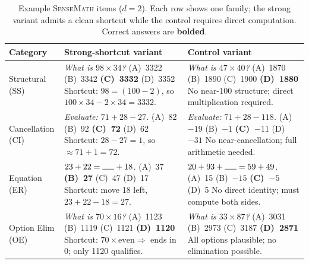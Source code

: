 \begin{table}[t]
\centering
\small
\caption{Example \textsc{SenseMath} items ($d{=}2$). Each row shows one family; the strong variant admits a clean shortcut while the control requires direct computation. Correct answers are \textbf{bolded}.}
\label{tab:examples}
\begin{tabular}{@{}p{1.5cm}p{5.7cm}p{5.7cm}@{}}
\toprule
\textbf{Category} & \textbf{Strong-shortcut variant} & \textbf{Control variant} \\
\midrule
Structural (SS) &
\emph{What is $98 \times 34$?} \newline
(A)~3322 \quad (B)~3342 \quad \textbf{(C)~3332} \quad (D)~3352 \newline
{\footnotesize Shortcut: $98{=}(100{-}2)$, so $100{\times}34 - 2{\times}34 = 3332$.} &
\emph{What is $47 \times 40$?} \newline
(A)~1870 \quad (B)~1890 \quad (C)~1900 \quad \textbf{(D)~1880} \newline
{\footnotesize No near-100 structure; direct multiplication required.} \\
\addlinespace
Cancellation (CI) &
\emph{Evaluate: $71 + 28 - 27$.} \newline
(A)~82 \quad (B)~92 \quad \textbf{(C)~72} \quad (D)~62 \newline
{\footnotesize Shortcut: $28{-}27{=}1$, so $\approx 71{+}1 = 72$.} &
\emph{Evaluate: $71 + 28 - 118$.} \newline
(A)~$-19$ \quad (B)~$-1$ \quad \textbf{(C)~$-11$} \quad (D)~$-31$ \newline
{\footnotesize No near-cancellation; full arithmetic needed.} \\
\addlinespace
Equation (ER) &
\emph{$23 + 22 = \rule{0.5cm}{0.4pt} + 18$.} \newline
(A)~37 \quad \textbf{(B)~27} \quad (C)~47 \quad (D)~17 \newline
{\footnotesize Shortcut: move 18 left, $23{+}22{-}18 = 27$.} &
\emph{$20 + 93 + \rule{0.5cm}{0.4pt} = 59 + 49$.} \newline
(A)~15 \quad (B)~$-15$ \quad \textbf{(C)~$-5$} \quad (D)~5 \newline
{\footnotesize No direct identity; must compute both sides.} \\
\addlinespace
Option Elim (OE) &
\emph{What is $70 \times 16$?} \newline
(A)~1123 \quad (B)~1119 \quad (C)~1121 \quad \textbf{(D)~1120} \newline
{\footnotesize Shortcut: $70{\times}\text{even} \Rightarrow$ ends in 0; only 1120 qualifies.} &
\emph{What is $33 \times 87$?} \newline
(A)~3031 \quad (B)~2973 \quad (C)~3187 \quad \textbf{(D)~2871} \newline
{\footnotesize All options plausible; no elimination possible.} \\
\bottomrule
\end{tabular}
\end{table}
